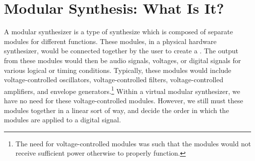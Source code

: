 \section[Modular Synthesis: What Is It?]{Modular Synthesis: What Is It?}\label{modular-synth-what-is}

A modular synthesizer is a type of synthesize which is composed of separate modules for different functions. These modules, in a physical hardware synthesizer, would be connected together by the user to create a . The output from these modules would then be audio signals, voltages, or digital signals for various logical or timing conditions. Typically, these modules would include voltage-controlled oscillators, voltage-controlled filters, voltage-controlled amplifiers, and envelope generators.\footnote{The need for voltage-controlled modules was such that the modules would not receive sufficient power otherwise to properly function.} Within a virtual modular synthesizer, we have no need for these voltage-controlled modules. However, we still must  these modules together in a linear sort of way, and decide the order in which the modules are applied to a digital signal. 